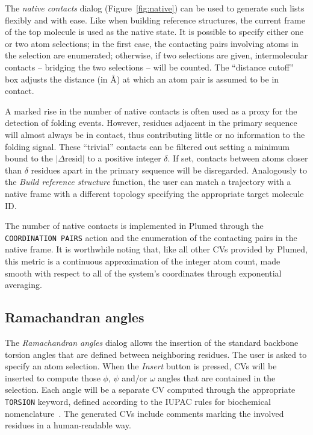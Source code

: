 \documentclass[preprint,review,11pt]{elsarticle}
\begin{document}
The \emph{native contacts} dialog (Figure~\ref{fig:native}) can be
used to generate such lists flexibly and with ease. Like when building
reference structures, the current frame of the top molecule is used as
the native state.  It is possible to specify either one or two atom
selections; in the first case, the contacting pairs involving atoms in
the selection are enumerated; otherwise, if two selections are given,
intermolecular contacts -- bridging the two selections -- will be
counted.  The ``distance cutoff'' box adjusts the distance (in \AA) at
which an atom pair is assumed to be in contact.

A marked rise in the number of native contacts is often used as a
proxy for the detection of folding events. However, residues adjacent
in the primary sequence will almost always be in contact, thus
contributing little or no information to the folding signal. These
``trivial'' contacts can be filtered out setting a minimum bound to
the $| \Delta \mbox{resid} |$ to a positive integer $\delta$. If set,
contacts between atoms closer than $\delta$ residues apart in the
primary sequence will be disregarded.
Analogously to the \emph{Build reference structure} function, the user
can match a trajectory with a native frame with a different topology
specifying the appropriate target molecule ID.

The number of native contacts is implemented in Plumed through the
\texttt{COORDINATION PAIRS} action and the enumeration of the
contacting pairs in the native frame.  It is worthwhile noting that,
like all other CVs provided by Plumed, this metric is a continuous
approximation of the integer atom count, made smooth with respect to
all of the system's coordinates through exponential averaging.




\subsection{Ramachandran angles}

The \emph{Ramachandran angles} dialog allows the insertion of the
standard backbone torsion angles that are defined between neighboring residues.
The user is asked to specify an atom selection. When the \emph{Insert}
button is pressed, CVs will be inserted to compute those $\phi$,
$\psi$ and/or $\omega$ angles that are contained in the
selection. Each angle will be a separate CV computed through the
appropriate \texttt{TORSION} keyword, defined according to the IUPAC
rules for biochemical nomenclature~\cite{IUPAC}. The generated CVs
include comments marking the involved residues in a human-readable
way.
\end{document}
